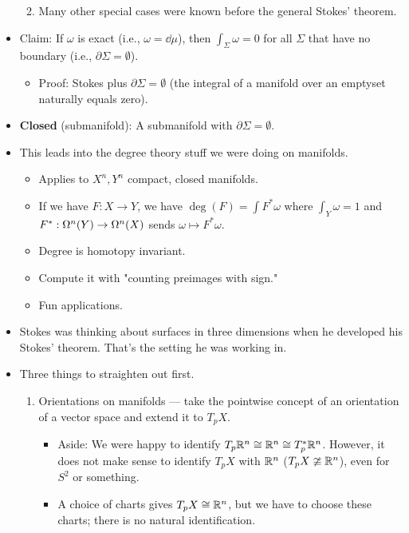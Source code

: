 \documentclass[../notes.tex]{subfiles}
\begin{document}
\begin{itemize}
\begin{enumerate}
\begin{itemize}
        \end{itemize}
        \item Many other special cases were known before the general Stokes' theorem.
    \end{enumerate}
    \item Claim: If $\omega$ is exact (i.e., $\omega=\dd\mu$), then $\int_\Sigma\omega=0$ for all $\Sigma$ that have no boundary (i.e., $\partial\Sigma=\emptyset$).
    \begin{itemize}
        \item Proof: Stokes plus $\partial\Sigma=\emptyset$ (the integral of a manifold over an emptyset naturally equals zero).
    \end{itemize}
    \item \textbf{Closed} (submanifold): A submanifold with $\partial\Sigma=\emptyset$.
    \item This leads into the degree theory stuff we were doing on manifolds.
    \begin{itemize}
        \item Applies to $X^n,Y^n$ compact, closed manifolds.
        \item If we have $F:X\to Y$, we have $\deg(F)=\int F^*\omega$ where $\int_Y\omega=1$ and $F^*:\ome[n]{Y}\to\ome[n]{X}$ sends $\omega\mapsto F^*\omega$.
        \item Degree is homotopy invariant.
        \item Compute it with "counting preimages with sign."
        \item Fun applications.
    \end{itemize}
    \item Stokes was thinking about surfaces in three dimensions when he developed his Stokes' theorem. That's the setting he was working in.
    \item Three things to straighten out first.
    \begin{enumerate}
        \item Orientations on manifolds --- take the pointwise concept of an orientation of a vector space and extend it to $T_pX$.
        \begin{itemize}
            \item Aside: We were happy to identify $T_p\R^n\cong\R^n\cong T_p^*\R^n$. However, it does not make sense to identify $T_pX$ with $\R^n$ ($T_pX\ncong\R^n$), even for $S^2$ or something.
            \item A choice of charts gives $T_pX\cong\R^n$, but we have to choose these charts; there is no natural identification.

\end{itemize}
\end{enumerate}
\end{itemize}
\end{document}
